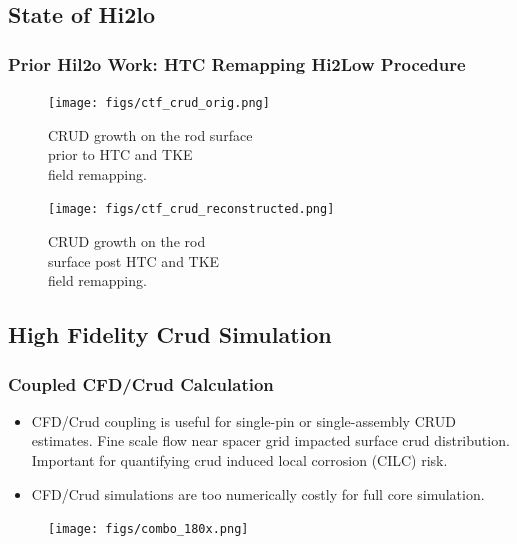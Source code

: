 \documentclass[t, pdftex]{beamer}
\begin{document}
\subsection*{State of Hi2lo}
\begin{frame}
\frametitle{Prior Hil2o Work: HTC Remapping Hi2Low Procedure}
\begin{figure}[!htbp]
\centering
\begin{minipage}{.5\textwidth}
    \texttt{[image: figs/ctf\_crud\_orig.png]}
    \caption{\centering \scriptsize{ CRUD growth on the rod surface \\ prior to HTC and TKE \\ field remapping.}}
    \label{fig:crud_pre_map}
\end{minipage}%
\begin{minipage}{.5\textwidth}
    \texttt{[image: figs/ctf\_crud\_reconstructed.png]}
    \caption{\centering \scriptsize CRUD growth on the rod \\ surface post HTC and TKE \\ field remapping.}
    \label{fig:crud_post_map}
\end{minipage}
\end{figure}
\end{frame}

\subsection*{High Fidelity Crud Simulation}
\begin{frame}[shrink=20]
    \frametitle{Coupled CFD/Crud Calculation}
    \begin{itemize}
    \item CFD/Crud coupling is useful for single-pin or single-assembly CRUD estimates.  Fine scale flow near spacer grid impacted surface crud distribution.  Important for quantifying crud induced local corrosion (CILC) risk.
    \item CFD/Crud simulations are too numerically costly for full core simulation.
    \end{itemize}
        \begin{figure}[!htbp]
\centering
\texttt{[image: figs/combo\_180x.png]}
\label{log_closed}
    \end{figure}
\end{frame}

\end{document}
